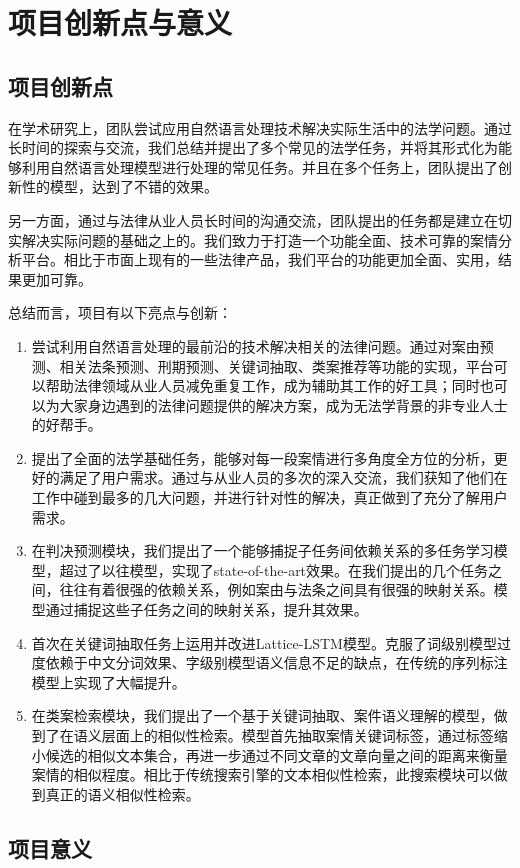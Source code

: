 \chapter{项目创新点与意义}
\label{cha: significance}

\section{项目创新点}

在学术研究上，团队尝试应用自然语言处理技术解决实际生活中的法学问题。通过长时间的探索与交流，我们总结并提出了多个常见的法学任务，并将其形式化为能够利用自然语言处理模型进行处理的常见任务。并且在多个任务上，团队提出了创新性的模型，达到了不错的效果。

另一方面，通过与法律从业人员长时间的沟通交流，团队提出的任务都是建立在切实解决实际问题的基础之上的。我们致力于打造一个功能全面、技术可靠的案情分析平台。相比于市面上现有的一些法律产品，我们平台的功能更加全面、实用，结果更加可靠。

总结而言，项目有以下亮点与创新：
\begin{enumerate}[1)]
	\item 尝试利用自然语言处理的最前沿的技术解决相关的法律问题。通过对案由预测、相关法条预测、刑期预测、关键词抽取、类案推荐等功能的实现，平台可以帮助法律领域从业人员减免重复工作，成为辅助其工作的好工具；同时也可以为大家身边遇到的法律问题提供的解决方案，成为无法学背景的非专业人士的好帮手。
	\item 提出了全面的法学基础任务，能够对每一段案情进行多角度全方位的分析，更好的满足了用户需求。通过与从业人员的多次的深入交流，我们获知了他们在工作中碰到最多的几大问题，并进行针对性的解决，真正做到了充分了解用户需求。
	\item 在判决预测模块，我们提出了一个能够捕捉子任务间依赖关系的多任务学习模型，超过了以往模型，实现了state-of-the-art效果。在我们提出的几个任务之间，往往有着很强的依赖关系，例如案由与法条之间具有很强的映射关系。模型通过捕捉这些子任务之间的映射关系，提升其效果。
	\item 首次在关键词抽取任务上运用并改进Lattice-LSTM模型。克服了词级别模型过度依赖于中文分词效果、字级别模型语义信息不足的缺点，在传统的序列标注模型上实现了大幅提升。
	\item 在类案检索模块，我们提出了一个基于关键词抽取、案件语义理解的模型，做到了在语义层面上的相似性检索。模型首先抽取案情关键词标签，通过标签缩小候选的相似文本集合，再进一步通过不同文章的文章向量之间的距离来衡量案情的相似程度。相比于传统搜索引擎的文本相似性检索，此搜索模块可以做到真正的语义相似性检索。
\end{enumerate}

\section{项目意义}




